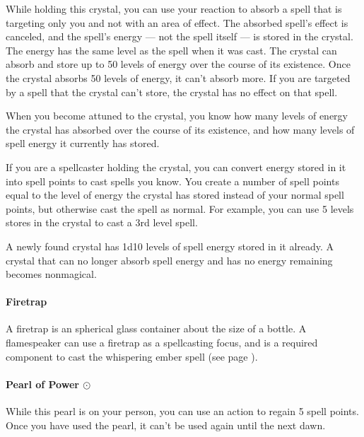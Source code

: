         While holding this crystal, you can use your reaction to absorb a spell that is targeting only you and not with an area of effect.
        The absorbed spell's effect is canceled, and the spell's energy --- not the spell itself --- is stored in the crystal.
        The energy has the same level as the spell when it was cast.
        The crystal can absorb and store up to 50 levels of energy over the course of its existence.
        Once the crystal absorbs 50 levels of energy, it can't absorb more.
        If you are targeted by a spell that the crystal can't store, the crystal has no effect on that spell.

        When you become attuned to the crystal, you know how many levels of energy the crystal has absorbed over the course of its existence, and how many levels of spell energy it currently has stored.

        If you are a spellcaster holding the crystal, you can convert energy stored in it into spell points to cast spells you know.
        You create a number of spell points equal to the level of energy the crystal has stored instead of your normal spell points, but otherwise cast the spell as normal.
        For example, you can use 5 levels stores in the crystal to cast a 3rd level spell.

        A newly found crystal has 1d10 levels of spell energy stored in it already.
        A crystal that can no longer absorb spell energy and has no energy remaining becomes nonmagical.
    \paragraph{Firetrap}
        A firetrap is an spherical glass container about the size of a bottle.
        A flamespeaker can use a firetrap as a spellcasting focus, and is a required component to cast the whispering ember spell (see page \pageref{spell::whisperingember}).
    \paragraph{Pearl of Power $\odot$}
        While this pearl is on your person, you can use an action to regain 5 spell points.
        Once you have used the pearl, it can't be used again until the next dawn.
